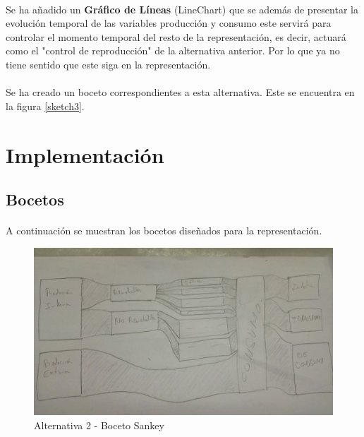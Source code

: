 \documentclass{article}
\begin{document}
			\paragraph{}
			Se ha añadido un  {\bf Gráfico de Líneas} (LineChart) que se además de presentar la evolución temporal de las variables producción y consumo este servirá para controlar el momento temporal del resto de la representación, es decir, actuará como el "control de reproducción" de la alternativa anterior. Por lo que ya no tiene sentido que este siga en la representación. 

			\paragraph{}
			Se ha creado un boceto correspondientes a esta alternativa. Este se encuentra en la figura \ref{sketch3}.

	\section{Implementación}

		\subsection{Bocetos}
		
			\paragraph{}
			A continuación se muestran los bocetos diseñados para la representación.
		
			\begin{figure}[H]
				\centering
				\includegraphics[width=140mm]{../res/sketch-sankey.jpg}
				\caption{Alternativa 2 - Boceto Sankey \label{sketchSankey}}
			\end{figure}
			
\end{document}
